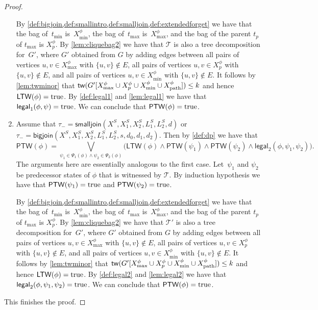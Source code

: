 \documentclass[a4paper,UKenglish,cleveref, autoref, thm-restate, numberwithinsect]{lipics-v2021}
\newcommand{\tw}{\mathsf{tw}}
\newcommand{\bigjoin}{\mathsf{bigjoin}}
\newcommand{\smalljoin}{\mathsf{smalljoin}}
\newcommand{\ptw}{\mathsf{PTW}}
\newcommand{\ltw}{\mathsf{LTW}}
\newcommand{\legal}{\mathsf{legal}}
\newcommand{\dpath}{\textup{path}}
\newcommand{\true}{\textup{true}}
\begin{document}
\begin{proof}
\begin{enumerate}
By \cref{def:bigjoin,def:smallintro,def:smalljoin,def:extendedforget}  we have that the bag of~$t_{\min}$ is~$X^{\phi}_{\min}$, the bag of~$t_{\max}$ is~$X^{\phi}_{\max}$, and the bag of the parent $t_p$ of $t_{\max}$ is $X^{\phi}_p$. 
By \cref{lem:cliquebag2} we have that $\mathcal{T}$ is also a tree decomposition for~$G'$, where $G'$ obtained from $G$ by adding edges between all pairs of vertices $u,v\in X^{\phi}_{\max}$ with $\{u,v\}\notin E$,  all pairs of vertices $u,v\in  X^{\phi}_p$ with $\{u,v\}\notin E$, and all pairs of vertices $u,v\in X^{\phi}_{\min}$ with $\{u,v\}\notin E$. It follows by \cref{lem:twminor} that $\tw(G'[X^{\phi}_{\max}\cup X^{\phi}_p\cup X^{\phi}_{\min}\cup X^{\phi}_{\dpath}])\le k$ and hence $\ltw({\phi})=\true$. 
By \cref{def:legal1} and \cref{lem:legal1} we have that $\legal_1({\phi},\psi)=\true$.
We can conclude that $\ptw({\phi})=\true$.
\item Assume that $\tau_-=\smalljoin(X^S,X_1^S,X_2^S,L_{1}^S, L_{2}^S,d)$ or $\tau_-=\bigjoin(X^S,X_1^S,X_2^S,L_{1}^S, L_{2}^S,s,d_0,d_1,d_2)$. 
Then by \cref{def:dp} we have that 
        \[
        \ptw(\phi) = \bigvee_{\psi_1\in\Psi_1(\phi)\wedge\psi_2\in\Psi_2(\phi)} \bigl(\ltw(\phi)\wedge\ptw(\psi_1)\wedge\ptw(\psi_2)\wedge \legal_2(\phi,\psi_1,\psi_2)\bigr).
        \]
The arguments here are essentially analogous to the first case.
Let~$\psi_1$ and $\psi_2$ be predecessor states of ${\phi}$ that is witnessed by $\mathcal{T}$. By induction hypothesis we have that $\ptw(\psi_1)=\true$ and $\ptw(\psi_2)=\true$.



By \cref{def:bigjoin,def:smallintro,def:smalljoin,def:extendedforget}  we have that the bag of~$t_{\min}$ is~$X^{\phi}_{\min}$, the bag of~$t_{\max}$ is~$X^{\phi}_{\max}$, and the bag of the parent $t_p$ of $t_{\max}$ is $X^{\phi}_p$. 
By \cref{lem:cliquebag2} we have that $\mathcal{T}'$ is also a tree decomposition for~$G'$, where $G'$ obtained from $G$ by adding edges between all pairs of vertices $u,v\in X^{\phi}_{\max}$ with $\{u,v\}\notin E$,  all pairs of vertices $u,v\in  X^{\phi}_p$ with $\{u,v\}\notin E$, and all pairs of vertices $u,v\in X^{\phi}_{\min}$ with $\{u,v\}\notin E$. It follows by \cref{lem:twminor} that $\tw(G'[X^{\phi}_{\max}\cup X^{\phi}_p\cup X^{\phi}_{\min}\cup X^{\phi}_{\dpath}])\le k$ and hence $\ltw({\phi})=\true$. 
By \cref{def:legal2} and \cref{lem:legal2} we have that $\legal_2(\phi,\psi_1,\psi_2)=\true$.
We can conclude that $\ptw(\phi)=\true$.
\end{enumerate}
This finishes the proof.
\end{proof}
\end{document}

